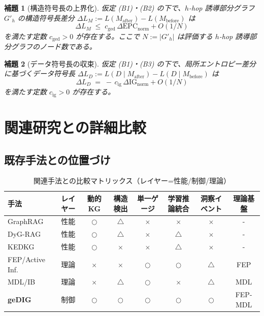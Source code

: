 \documentclass[ja=standard,xelatex]{bxjsarticle}
\newtheorem{lemma}{補題}[section]
\newcommand{\gednorm}{\Delta\mathrm{EPC}_{\mathrm{norm}}}
\newcommand{\ignorm}{\Delta\mathrm{IG}_{\mathrm{norm}}}
\begin{document}
\begin{lemma}[構造符号長の上界化]
\label{lem:structure_code_length}
仮定 (B1)・(B2) の下で、$h$-hop 誘導部分グラフ $G'_h$ の構造符号長差分 $\Delta L_M:=L(M_{\mathrm{after}})-L(M_{\mathrm{before}})$ は
\[
  \Delta L_M \;\le\; c_{\mathrm{ged}}\,\gednorm + O(1/N)
\]
を満たす定数 $c_{\mathrm{ged}}>0$ が存在する。ここで $N:=|G'_h|$ は評価する $h$-hop 誘導部分グラフのノード数である。
\end{lemma}

\begin{lemma}[データ符号長の収束]
\label{lem:data_code_length}
仮定 (B1)・(B3) の下で、局所エントロピー差分に基づくデータ符号長 $\Delta L_D:=L(D\mid M_{\mathrm{after}})-L(D\mid M_{\mathrm{before}})$ は
\[
  \Delta L_D \;=\; -\,c_{\mathrm{ig}}\,\ignorm + O(1/N)
\]
を満たす定数 $c_{\mathrm{ig}}>0$ が存在する。
\end{lemma}

\section{関連研究との詳細比較}

\subsection{既存手法との位置づけ}

\begin{table}[H]
\centering
\caption{関連手法との比較マトリックス（レイヤー=性能/制御/理論）}
\label{tab:related_comparison}
\small
\begin{tabular}{lccccccc}
\toprule
手法 & レイヤー & 動的KG & 構造検出 & 単一ゲージ & 学習推論統合 & 洞察イベント & 理論基盤 \\
\midrule
GraphRAG & 性能 & $\bigcirc$ & $\triangle$ & $\times$ & $\times$ & $\times$ & - \\
DyG-RAG & 性能 & $\bigcirc$ & $\triangle$ & $\times$ & $\triangle$ & $\times$ & - \\
KEDKG & 性能 & $\bigcirc$ & $\times$ & $\times$ & $\triangle$ & $\times$ & - \\
FEP/Active Inf. & 理論 & $\times$ & $\times$ & $\bigcirc$ & $\bigcirc$ & $\triangle$ & FEP \\
MDL/IB & 理論 & $\times$ & $\triangle$ & $\bigcirc$ & $\times$ & $\triangle$ & MDL \\
\textbf{geDIG} & 制御 & $\bigcirc$ & $\bigcirc$ & $\bigcirc$ & $\bigcirc$ & $\bigcirc$ & FEP-MDL \\
\bottomrule
\end{tabular}
\end{table}
\end{document}
